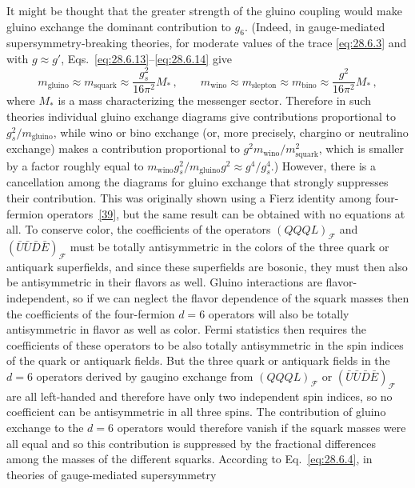 It might be thought that the greater strength of the gluino coupling would
make gluino exchange the dominant contribution to \(g_6\). (Indeed, in
gauge-mediated supersymmetry-breaking theories, for moderate values of the
trace \eqref{eq:28.6.3} and with \(g\approx g'\),
Eqs.~\eqref{eq:28.6.13}--\eqref{eq:28.6.14} give
\[
  m_{\mathrm{gluino}}\approx m_{\mathrm{squark}}
    \approx\frac{g_s^2}{16\pi^2}M_*\,,
  \qquad
  m_{\mathrm{wino}}\approx m_{\mathrm{slepton}}\approx m_{\mathrm{bino}}
    \approx\frac{g^2}{16\pi^2}M_*\,,
\]
where \(M_*\) is a mass characterizing the messenger sector. Therefore in
such theories individual gluino exchange diagrams give contributions
proportional to \(g_s^2/m_{\mathrm{gluino}}\), while wino or bino exchange
(or, more precisely, chargino or neutralino exchange) makes a contribution
proportional to \(g^2m_{\mathrm{wino}}/m_{\mathrm{squark}}^2\), which is
smaller by a factor roughly equal to
\(m_{\mathrm{wino}}g_s^2/m_{\mathrm{gluino}}g^2
\approx g^4/g_s^4\).) However, there is a cancellation among the diagrams
for gluino exchange that strongly suppresses their contribution. This was
originally shown using a Fierz identity among four-fermion
operators~\hyperref[ch28-ref-39]{[39]}, but the same result
can be obtained with no equations at all. To conserve color, the
coefficients of the operators \((QQQL)_{\mathcal F}\) and
\((\bar U\bar U\bar D\bar E)_{\mathcal F}\) must be totally antisymmetric
in the colors of the three quark or antiquark superfields, and since these
superfields are bosonic, they must then also be antisymmetric in their
flavors as well. Gluino interactions are flavor-independent, so if we can
neglect the flavor dependence of the squark masses then the coefficients of
the four-fermion \(d=6\) operators will also be totally antisymmetric in
flavor as well as color. Fermi statistics then requires the coefficients
of these operators to be also totally antisymmetric in the spin indices of
the quark or antiquark fields. But the three quark or antiquark fields in
the \(d=6\) operators derived by gaugino exchange from
\((QQQL)_{\mathcal F}\) or \((\bar U\bar U\bar D\bar E)_{\mathcal F}\)
are all left-handed and therefore have only two independent spin indices,
so no coefficient can be antisymmetric in all three spins. The contribution
of gluino exchange to the \(d=6\) operators would therefore vanish if the
squark masses were all equal and so this contribution is suppressed by the
fractional differences among the masses of the different squarks. According
to Eq.~\eqref{eq:28.6.4}, in theories of gauge-mediated supersymmetry
